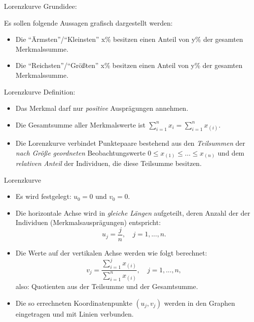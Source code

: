 \documentclass[
  10pt,
  ignorenonframetext,
]{beamer}
\providecommand{\tightlist}{%
  \setlength{\itemsep}{0pt}\setlength{\parskip}{0pt}}
\begin{document}
\begin{frame}{Lorenzkurve}
\protect\hypertarget{lorenzkurve}{}
Grundidee:

Es sollen folgende Aussagen grafisch dargestellt werden:

\begin{itemize}
\tightlist
\item
  Die ``Ärmsten''/``Kleinsten'' x\% besitzen einen Anteil von y\% der
  gesamten Merkmalssumme.
\item
  Die ``Reichsten''/``Größten'' x\% besitzen einen Anteil von y\% der
  gesamten Merkmalssumme.
\end{itemize}
\end{frame}

\begin{frame}{Lorenzkurve}
\protect\hypertarget{lorenzkurve-1}{}
Definition:

\begin{itemize}
\tightlist
\item
  Das Merkmal darf nur \emph{positive} Ausprägungen annehmen.
\item
  Die Gesamtsumme aller Merkmalswerte ist
  \(\sum_{i=1}^n x_i=\sum_{i=1}^n x_{(i)}\).
\item
  Die Lorenzkurve verbindet Punktepaare bestehend aus den
  \emph{Teilsummen} der \emph{nach Größe geordneten} Beobachtungswerte
  \(0 \leq  x_{(1)} \leq \ldots \leq x_{(n)}\) und dem \emph{relativen
  Anteil} der Individuen, die diese Teilsumme besitzen.
\end{itemize}
\end{frame}

\begin{frame}{Lorenzkurve}
\protect\hypertarget{lorenzkurve-2}{}
\begin{itemize}
\tightlist
\item
  Es wird festgelegt: \(u_{0} = 0\) und \(v_{0} = 0\).
\item
  Die horizontale Achse wird in \emph{gleiche Längen} aufgeteilt, deren
  Anzahl der der Individuen (Merkmalsausprägungen) entspricht: \[
                   u_{j} = \frac{j}{n}, \quad j = 1, ..., n.
               \]
\item
  Die Werte auf der vertikalen Achse werden wie folgt berechnet: \[
                   v_{j} = \frac{\sum_{i=1}^{j} x_{(i)}}{\sum_{i=1}^{n} x_{(i)}}, \quad j = 1, ..., n,
               \] also: Quotienten aus der Teilsumme und der
  Gesamtsumme.
\item
  Die so errechneten Koordinatenpunkte \((u_j,v_j)\) werden in den
  Graphen eingetragen und mit Linien verbunden.
\end{itemize}
\end{frame}
\end{document}
